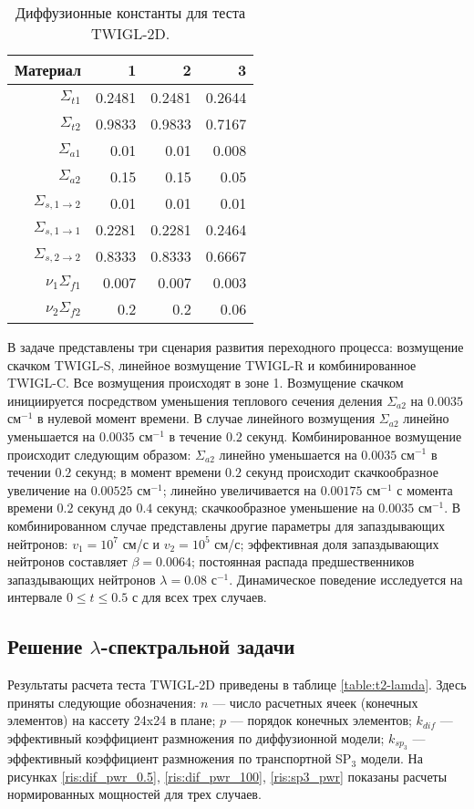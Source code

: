 \documentclass[a4paper,12pt]{article}
\begin{document}
\begin{table}[htp]
\caption{\label{table:coeff}Диффузионные константы для теста TWIGL-2D.}
\label{t1}
\begin{center}
\begin{tabular}{rrrr}
\hline
Материал & 1 & 2 & 3\\
\hline 
$\Sigma_{t1}$ & 0.2481 & 0.2481 & 0.2644 \\
$\Sigma_{t2}$ & 0.9833 & 0.9833 & 0.7167 \\
$\Sigma_{a1}$ & 0.01 & 0.01 & 0.008\\
$\Sigma_{a2}$ & 0.15 & 0.15 & 0.05\\
$\Sigma_{s,1\rightarrow2}$ & 0.01 & 0.01  & 0.01\\
$\Sigma_{s,1\rightarrow1}$ & 0.2281 & 0.2281 & 0.2464\\
$\Sigma_{s,2\rightarrow2}$ & 0.8333 & 0.8333 & 0.6667\\
$\nu_1\Sigma_{f1}$ & 0.007 & 0.007 & 0.003\\
$\nu_2\Sigma_{f2}$ & 0.2 & 0.2 & 0.06\\
\hline
\end{tabular}
\end{center}
\end{table}

В задаче представлены три сценария развития переходного процесса: возмущение скачком TWIGL-S, линейное возмущение TWIGL-R и комбинированное TWIGL-C. Все возмущения происходят в зоне 1.
Возмущение скачком инициируется посредством уменьшения теплового сечения деления $\Sigma_{a2}$ на $0.0035$ см$^{-1}$ в нулевой момент времени. 
В случае линейного возмущения $\Sigma_{a2}$ линейно уменьшается на $0.0035$ см$^{-1}$ в течение $0.2$ секунд.
Комбинированное возмущение происходит следующим образом:
$\Sigma_{a2}$ линейно уменьшается на $0.0035$ см$^{-1}$ в течении $0.2$ секунд; в момент времени $0.2$ секунд происходит скачкообразное увеличение на $0.00525$ см$^{-1}$; линейно увеличивается на $0.00175$ см$^{-1}$  с момента времени $0.2$ секунд до $0.4$ секунд;  скачкообразное уменьшение на $0.0035$ см$^{-1}$.
В комбинированном случае представлены другие параметры для запаздывающих нейтронов: $v_1 = 10^7$ см/с и $v_2 = 10^5$ см/с; эффективная доля запаздывающих нейтронов составляет $\beta = 0.0064$;  постоянная распада предшественников запаздывающих нейтронов $\lambda = 0.08$ с$^{-1}$. 
Динамическое поведение исследуется на интервале $0 \leq t \leq 0.5$ с для всех трех случаев. 

\subsection{Решение $\lambda$-спектральной задачи}
Результаты расчета теста TWIGL-2D приведены в таблице \ref{table:t2-lamda}.
Здесь приняты следующие обозначения: 
$n$ --- число расчетных ячеек (конечных элементов) на кассету 24x24 в плане; 
$p$ --- порядок конечных элементов;
$k_{dif}$ --- эффективный коэффициент размножения по диффузионной модели; $k_{sp_3}$ --- эффективный коэффициент размножения по транспортной SP$_3$ модели. 
На рисунках \ref{ris:dif_pwr_0.5}, \ref{ris:dif_pwr_100}, \ref{ris:sp3_pwr} показаны расчеты нормированных мощностей для трех случаев. 
\end{document}
